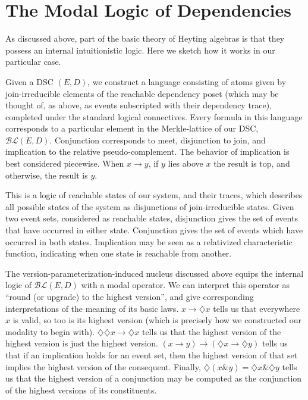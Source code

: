 \documentclass[a4paper,USenglish,cleveref, autoref, thm-restate,authorcolumns]{lipics-v2019}
\newcommand{\BLc}{\mathcal{BL}}
\newcommand{\band}{\mathop{\&}}
\newcommand{\Dia}{\diamondsuit}
\begin{document}
\section{The Modal Logic of Dependencies}
As discussed above, part of the basic theory of Heyting algebras is that they possess an internal intuitionistic logic. Here we sketch how it works in our particular case.

Given a DSC \((E,D)\), we construct a language consisting of atoms given by join-irreducible elements of the reachable dependency poset (which may be thought of, as above, as events subscripted with their dependency trace), completed under the standard logical connectives. Every formula in this language corresponds to a particular element in the Merkle-lattice of our DSC, \(\BLc(E,D)\).  Conjunction corresponds to meet, disjunction to join, and implication to the relative pseudo-complement. The behavior of implication is best considered piecewise. When \(x \rightarrow y\), if \(y\) lies above \(x\) the result is top, and otherwise, the result is \(y\).

This is a logic of reachable states of our system, and their traces, which describes all possible states of the system as disjunctions of join-irreducible states. Given two event sets, considered as reachable states, disjunction gives the set of events that have occurred in either state. Conjunction gives the set of events which have occurred in both states. Implication may be seen as a relativized characteristic function, indicating when one state is reachable from another.

The version-parameterization-induced nucleus discussed above equips the internal logic of \(\BLc(E,D)\) with a modal operator. We can interpret this operator as ``round (or upgrade) to the highest version'', and give corresponding interpretations of the meaning of its basic laws. \(x \rightarrow \Dia{x}\) tells us that everywhere \(x\) is valid, so too is its highest version (which is precisely how we constructed our modality to begin with). \(\Dia\Dia{x} \rightarrow \Dia{x}\) tells us that the highest version of the highest version is just the highest version. \((x \rightarrow y) \rightarrow (\Dia{x} \rightarrow \Dia{y})\)  tells us that if an implication holds for an event set, then the highest version of that set implies the highest version of the consequent. Finally, \(\Dia(x \band y) = \Dia{x} \band \Dia{y}\) tells us that the highest version of a conjunction may be computed as the conjunction of the highest versions of its constituents.
\end{document}
